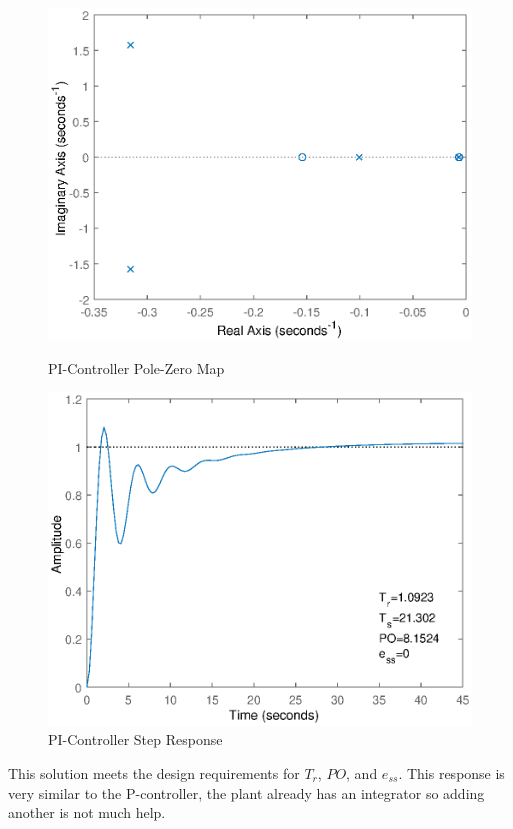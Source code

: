 \documentclass{article}
\begin{document}
    \begin{figure}[ht]
        \centering
        \begin{minipage}[t]{.5\textwidth}
            \includegraphics[scale=.5]{PIPoles.eps}
            \caption{PI-Controller Pole-Zero Map}
            \label{fig:PIPoles}
        \end{minipage}%
        \begin{minipage}[t]{.5\textwidth}
            \includegraphics[scale=.5]{PIResponse.eps}
            \caption{PI-Controller Step Response}
            \label{fig:PIResponse}
        \end{minipage}\hfill
    \end{figure}
    This solution meets the design requirements for $T_r$, $PO$, and $e_{ss}$.
    This response is very similar to the P-controller, the plant already has an integrator so adding another is not much help.
\end{document}
